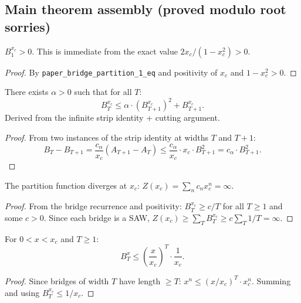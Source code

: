 \begin{lemma}
\begin{enumerate}
\section{Main theorem assembly (proved modulo root sorries)}
\label{sec:main-assembly}

\begin{theorem}
\label{thm:bridge-partition-pos}
\leanok
{}
  $B_1^{x_c} > 0$. This is immediate from the exact value
  $2x_c/(1-x_c^2) > 0$.
\end{theorem}
\begin{proof}
\leanok
  By \texttt{paper\_bridge\_partition\_1\_eq} and positivity of $x_c$
  and $1 - x_c^2 > 0$.
\end{proof}

\begin{theorem}
\label{thm:bridge-recurrence-proved}
  There exists $\alpha > 0$ such that for all $T$:
  \[
    B_T^{x_c} \leq \alpha \cdot (B_{T+1}^{x_c})^2 + B_{T+1}^{x_c}.
  \]
  Derived from the infinite strip identity + cutting argument.
\end{theorem}
\begin{proof}
  From two instances of the strip identity at widths $T$ and $T{+}1$:
  \[
    B_T - B_{T+1} = \frac{c_\alpha}{x_c}(A_{T+1} - A_T)
    \leq \frac{c_\alpha}{x_c} \cdot x_c \cdot B_{T+1}^2
    = c_\alpha \cdot B_{T+1}^2.
  \]
\end{proof}

\begin{theorem}[$Z(x_c) = \infty$ (proved modulo root sorries)]
\label{thm:Z-xc-div-proved}
  The partition function diverges at $x_c$: $Z(x_c) = \sum_n c_n x_c^n = \infty$.
\end{theorem}
\begin{proof}
  From the bridge recurrence and positivity: $B_T^{x_c} \geq c/T$ for
  all $T \geq 1$ and some $c > 0$. Since each bridge is a SAW,
  $Z(x_c) \geq \sum_T B_T^{x_c} \geq c \sum_T 1/T = \infty$.
\end{proof}

\begin{theorem}
\label{thm:bridge-decay-proved}
  For $0 < x < x_c$ and $T \geq 1$:
  \[
    B_T^x \leq \left(\frac{x}{x_c}\right)^T \cdot \frac{1}{x_c}.
  \]
\end{theorem}
\begin{proof}
  Since bridges of width $T$ have length $\geq T$:
  $x^n \leq (x/x_c)^T \cdot x_c^n$. Summing and using $B_T^{x_c} \leq 1/x_c$.
\end{proof}


\end{enumerate}
\end{lemma}
